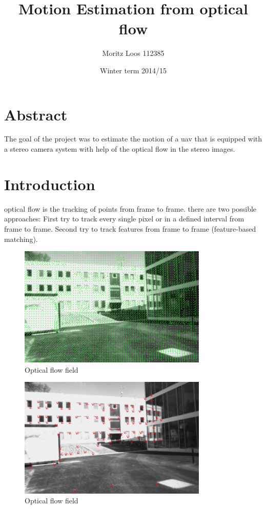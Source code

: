 \documentclass[11pt]{article}
\title{\textbf{Motion Estimation from optical flow}}
\author{ Moritz Loos 112385 }
\date{ Winter term 2014/15 }
\begin{document}
	
	\maketitle

	\section{Abstract}
	The goal of the project was to estimate the motion of a uav that is equipped with a stereo camera system with help of the optical flow in the stereo images.

	\section{Introduction}
	optical flow is the tracking of points from frame to frame. there are two possible approaches:
	First try to track every single pixel or in a defined interval from frame to frame. Second try to track features from frame to frame (feature-based matching).
	
	\begin{figure}[ht!]
		\centering
		\includegraphics[width=90mm]{images/farneback.jpg}
		\caption{Optical flow field \label{overflow}}
	\end{figure}
	
	\begin{figure}[ht!]
		\centering
		\includegraphics[width=90mm]{images/feature-based-matching.jpg}
		\caption{Optical flow field \label{overflow}}
	\end{figure}
	
\end{document}
